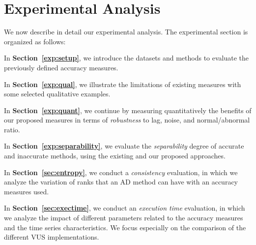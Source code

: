 \section{Experimental Analysis}
\label{sec:exp}
We now describe in detail our experimental analysis. The experimental section is organized as follows:

\noindent In {\bf 
Section~\ref{exp:setup}}, we introduce the datasets and methods to evaluate the previously defined accuracy measures.

\noindent In {\bf 
Section~\ref{exp:qual}}, we illustrate the limitations of existing measures with some selected qualitative examples.

\noindent In {\bf 
Section~\ref{exp:quant}}, we continue by measuring quantitatively the benefits of our proposed measures in terms of {\it robustness} to lag, noise, and normal/abnormal ratio.

\noindent In {\bf 
Section~\ref{exp:separability}}, we evaluate the {\it separability} degree of accurate and inaccurate methods, using the existing and our proposed approaches.

\noindent In {\bf 
Section~\ref{sec:entropy}}, we conduct a {\it consistency} evaluation, in which we analyze the variation of ranks that an AD method can have with an accuracy measures used.

\noindent In {\bf 
Section~\ref{sec:exectime}}, we conduct an {\it execution time} evaluation, in which we analyze the impact of different parameters related to the accuracy measures and the time series characteristics. 
We focus especially on the comparison of the different VUS implementations.

